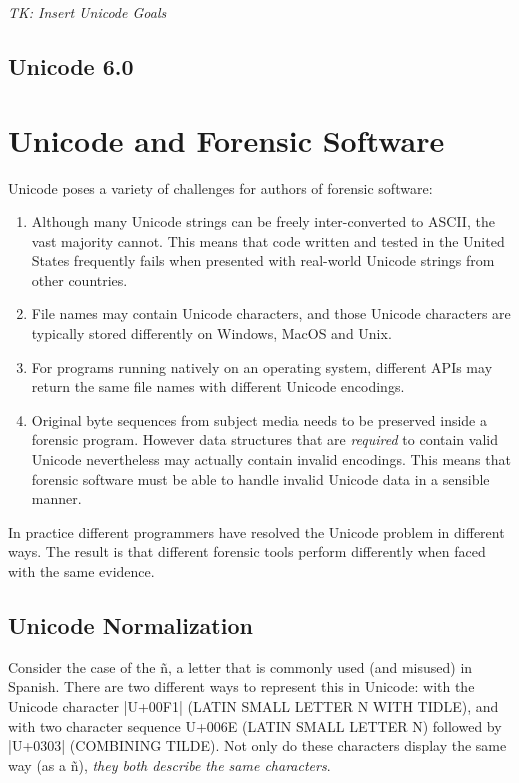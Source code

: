 \emph{TK: Insert Unicode Goals}

\subsection{Unicode 6.0}

\section{Unicode and Forensic Software}

Unicode poses a variety of challenges for authors of forensic
software:

\begin{enumerate}
\item Although many Unicode strings can be freely inter-converted to
  ASCII, the vast majority cannot. This means that code written and
  tested in the United States frequently fails when presented with
  real-world Unicode strings from other countries.
\item File names may contain Unicode characters, and those Unicode
  characters are typically stored differently on Windows, MacOS and
  Unix. 
\item For programs running natively on an operating system, different
  APIs may return the same file names with different Unicode
  encodings.
\item Original byte sequences from subject media needs to be
  preserved inside a forensic program. However data structures 
  that are \emph{required} to contain valid Unicode nevertheless may
  actually contain invalid encodings. This means that forensic
  software must be able to handle invalid Unicode data in a sensible manner.

\end{enumerate}

In practice different programmers have resolved the Unicode problem in
different ways. The result is that different forensic tools perform
differently when faced with the same evidence.

\subsection{Unicode Normalization}

Consider the case of the \~n, a letter that is commonly used (and
misused) in Spanish. There are two different ways to represent this in
Unicode: with the Unicode character |U+00F1| (LATIN SMALL LETTER N
WITH TIDLE), and with two character sequence U+006E (LATIN SMALL
LETTER N) followed by |U+0303| (COMBINING TILDE). Not only do these
characters display the same way (as a \~n), \emph{they both describe
  the same  characters}.

